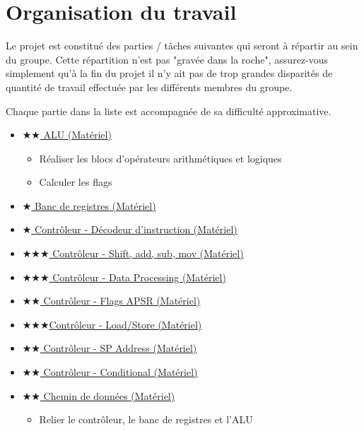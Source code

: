 \documentclass{article}
\begin{document}
    \section{Organisation du travail}

    Le projet est constitué des parties / tâches suivantes qui seront à répartir au sein du groupe.
    Cette répartition n'est pas "gravée dans la roche", assurez-vous simplement qu'à la fin du projet il n'y ait pas de trop grandes disparités de quantité de travail effectuée par les différents membres du groupe.

    Chaque partie dans la liste est accompagnée de sa difficulté approximative.

    \begin{itemize}
        \item \hyperref[sec:ALU]{$\bigstar\bigstar$ ALU (Matériel)}
        \begin{itemize}
            \item Réaliser les blocs d'opérateurs arithmétiques et logiques
            \item Calculer les flags
        \end{itemize}
        \item \hyperref[sec:BDR]{$\bigstar$ Banc de registres (Matériel)}
        \item \hyperref[sec:OpDec]{$\bigstar$ Contrôleur - Décodeur d'instruction (Matériel)}
        \item \hyperref[sec:SASM]{$\bigstar\bigstar\bigstar$ Contrôleur - Shift, add, sub, mov (Matériel)}
        \item \hyperref[sec:DataProc]{$\bigstar\bigstar\bigstar$ Contrôleur - Data Processing (Matériel)}
        \item \hyperref[sec:FlagsAPSR]{$\bigstar\bigstar$ Contrôleur - Flags APSR (Matériel)}
        \item \hyperref[sec:LoadStore]{$\bigstar\bigstar\bigstar$Contrôleur - Load/Store (Matériel)}
        \item \hyperref[sec:SPAddr]{$\bigstar\bigstar$ Contrôleur - SP Address (Matériel)}
        \item \hyperref[sec:Conditional]{$\bigstar\bigstar$ Contrôleur - Conditional (Matériel)}
        \item \hyperref[sec:DataPath]{$\bigstar\bigstar$ Chemin de données (Matériel)}
        \begin{itemize}
            \item Relier le contrôleur, le banc de registres et l'ALU
        \end{itemize}

\end{itemize}
\end{document}
